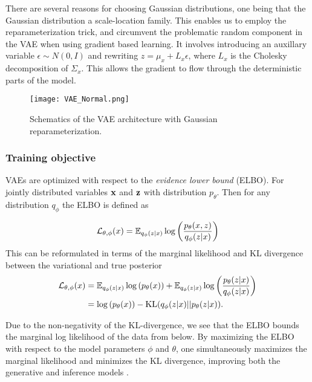 \documentclass[../../thesis.tex]{subfiles}
\begin{document}
There are several reasons for choosing Gaussian distributions, one being that the Gaussian distribution a scale-location family. This enables us to employ the reparameterization trick, and circumvent the problematic random component in the VAE when using gradient based learning. It involves introducing an auxillary variable $\epsilon \sim N(0,I)$ and rewriting $z = \mu_x + L_x\epsilon $, where $L_x$ is the Cholesky decomposition of $\Sigma_x$. This allows the gradient to flow through the deterministic parts of the model.
\begin{figure}[h]
    \texttt{[image: VAE\_Normal.png]}
    \centering
    \caption{Schematics of the VAE architecture with Gaussian reparameterization.}
    \label{fig:VAE_Normal}
\end{figure}


\subsubsection{Training objective}

VAEs are optimized with respect to the \textit{evidence lower bound} (ELBO). For jointly distributed variables $\mathbf{x}$ and $\mathbf{z}$ with distribution $p_\theta$. Then for any distribution $q_\phi$ the ELBO is defined as

\begin{equation}
    \label{eq:ELBO}
    \mathcal{L}_{\theta,\phi}(x) 
    = \mathbb{E}_{q_\phi(z|x)} \log \left( \frac{p_\theta(x,z)}{q_\phi(z|x)}\right)
\end{equation}
This can be reformulated in terms of the marginal likelihood and KL divergence between the variational and true posterior
\begin{equation}
    \begin{aligned}
        \label{eq:ELBO_loglik}
        \mathcal{L}_{\theta,\phi}(x) 
        &=  \mathbb{E}_{q_\phi(z|x)} \log \left( p_\theta(x)\right) + \mathbb{E}_{q_\phi(z|x)} \log \left( \frac{p_\theta(z|x)}{q_\phi(z|x)}\right) \\
        &= \log \left( p_\theta(x)\right) - \textrm{KL}(q_\phi(z|x)|| p_\theta(z|x)).
    \end{aligned}
\end{equation}

Due to the non-negativity of the KL-divergence, we see that the ELBO bounds the marginal log likelihood of the data from below. By maximizing the ELBO with respect to the model parameters $\phi$ and $\theta$,  one simultaneously maximizes the marginal likelihood and minimizes the KL divergence, improving both the generative and inference models \cite{VAE}.\newline
\end{document}
